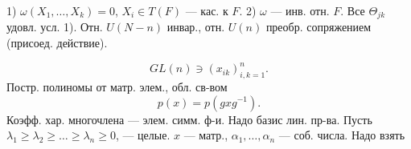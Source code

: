 1) $\omega(X_1,\dots,X_k)=0$, $X_i\in T(F)$ --- кас. к $F$.
2) $\omega$ --- инв. отн. $F$.
Все $\Theta_{jk}$ удовл. усл. 1).
Отн. $U(N-n)$ инвар., отн. $U(n)$ преобр. сопряжением (присоед. действие).
\begin{center}\end{center}
\begin{equation*}GL(n)\ni(x_{ik})_{i,k=1}^n.\end{equation*}
Постр. полиномы от матр. элем., обл. св-вом
\begin{equation*}p(x)=p(gxg^{-1}).\end{equation*}
Коэфф. хар. многочлена --- элем. симм. ф-и.
Надо базис лин. пр-ва.
Пусть $\lambda_1\ge\lambda_2\ge\dots\ge\lambda_n\ge0$, --- целые.
$x$ --- матр., $\alpha_1,\dots,\alpha_n$ --- соб. числа. Надо взять


